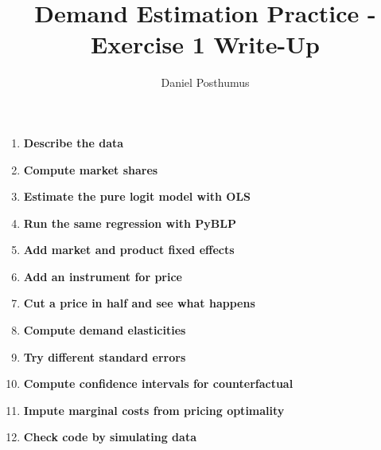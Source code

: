 \documentclass{article}
\title{Demand Estimation Practice - Exercise 1 Write-Up}
\author{Daniel Posthumus}
\begin{document}
\maketitle 


\begin{enumerate}

\item \textbf{Describe the data}



\item \textbf{Compute market shares} 



\item \textbf{Estimate the pure logit model with OLS}



\item \textbf{Run the same regression with PyBLP}



\item \textbf{Add market and product fixed effects} 



\item \textbf{Add an instrument for price}



\item \textbf{Cut a price in half and see what happens}



\item \textbf{Compute demand elasticities}



\item \textbf{Try different standard errors}



\item \textbf{Compute confidence intervals for counterfactual}



\item \textbf{Impute marginal costs from pricing optimality}



\item \textbf{Check code by simulating data}



\end{enumerate}
\end{document}
